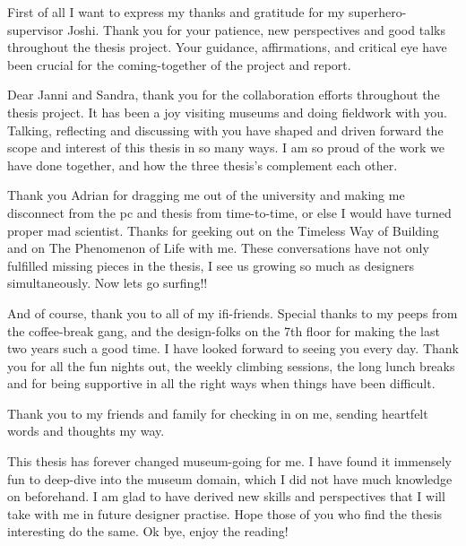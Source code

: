 
First of all I want to express my thanks and gratitude for my superhero-supervisor Joshi. Thank you for your patience, new perspectives and good talks throughout the thesis project. Your guidance, affirmations, and critical eye have been crucial for the coming-together of the project and report.

Dear Janni and Sandra, thank you for the collaboration efforts throughout the thesis project. It has been a joy visiting museums and doing fieldwork with you. Talking, reflecting and discussing with you have shaped and driven forward the scope and interest of this thesis in so many ways. I am so proud of the work we have done together, and how the three thesis's complement each other.

Thank you Adrian for dragging me out of the university and making me disconnect from the pc and thesis from time-to-time, or else I would have turned proper mad scientist. Thanks for geeking out on the Timeless Way of Building and on The Phenomenon of Life with me. These conversations have not only fulfilled missing pieces in the thesis, I see us growing so much as designers simultaneously. Now lets go surfing!!

And of course, thank you to all of my ifi-friends. Special thanks to my peeps from the coffee-break gang, and the design-folks on the 7th floor for making the last two years such a good time. I have looked forward to seeing you every day. Thank you for all the fun nights out, the weekly climbing sessions, the long lunch breaks and for being supportive in all the right ways when things have been difficult.

Thank you to my friends and family for checking in on me, sending heartfelt words and thoughts my way.

This thesis has forever changed museum-going for me. I have found it immensely fun to deep-dive into the museum domain, which I did not have much knowledge on beforehand. I am glad to have derived new skills and perspectives that I will take with me in future designer practise. Hope those of you who find the thesis interesting do the same. Ok bye, enjoy the reading!